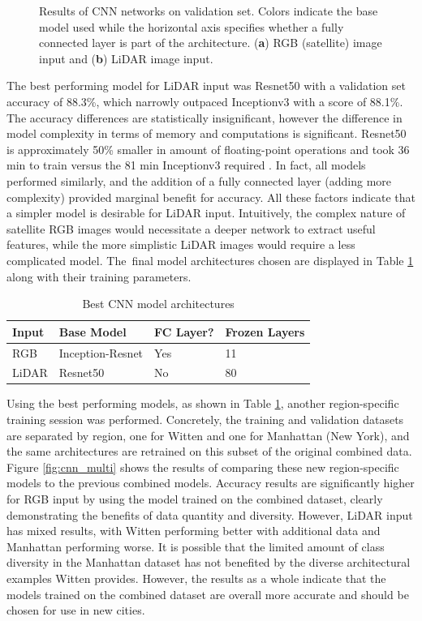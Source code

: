 \begin{figure}[ht]
    \caption[Results of CNN networks on validation set]{Results of CNN networks on validation set. Colors indicate the base model used while the horizontal axis specifies whether a fully connected layer is part of the architecture. (\textbf{a}) RGB (satellite) image input and (\textbf{b}) LiDAR image input.}
    \label{fig:cnn_val}
\end{figure}

The best performing model for LiDAR input was  Resnet50 with a validation set accuracy of 88.3\%, which narrowly outpaced Inceptionv3 with a score of 88.1\%. The accuracy differences are statistically insignificant, however the difference in model complexity in terms of memory and computations is significant.  Resnet50 is approximately 50\% smaller in amount of floating-point operations and took 36 min to train versus the 81 min Inceptionv3 required \cite{canziani_analysis_2017}.  In fact, all models performed similarly, and the addition of a fully connected layer (adding more complexity) provided marginal benefit for accuracy. All these factors indicate that a simpler model is desirable for LiDAR input.  Intuitively, the complex nature of satellite RGB images would necessitate a deeper network to extract useful features, while the more simplistic LiDAR images would require a less complicated model. The~final model architectures chosen are displayed in Table \ref{table:best_cnn_arch} along with their training parameters.

\begin{table}[H]
\centering
\caption{Best CNN model architectures}\label{table:best_cnn_arch}
\begin{tabular}{llll}
\toprule
\textbf{Input} & \textbf{Base Model}       & \textbf{FC Layer?} & \textbf{Frozen Layers} \\ \midrule
RGB   & Inception-Resnet & Yes       & 11            \\
LiDAR & Resnet50         & No        & 80   \\
\bottomrule        
\end{tabular}
\end{table}


Using the best performing models, as shown in Table \ref{table:best_cnn_arch}, another region-specific training session was performed.  Concretely, the training and validation datasets are separated by region, one for Witten and one for Manhattan (New York), and the same architectures are retrained on this subset of the original combined data. Figure \ref{fig:cnn_multi} shows the results of comparing these new region-specific models to the previous combined models.  Accuracy results are significantly higher for RGB input by using the model trained on the combined dataset, clearly demonstrating the benefits of data quantity and diversity. However, LiDAR input has mixed results, with Witten performing better with additional data and Manhattan performing worse. It is possible that the limited amount of class diversity in the Manhattan dataset has not benefited by the diverse architectural examples Witten provides. However, the results as a whole indicate that the models trained on the combined dataset are overall more accurate and should be chosen for use in new cities. 


